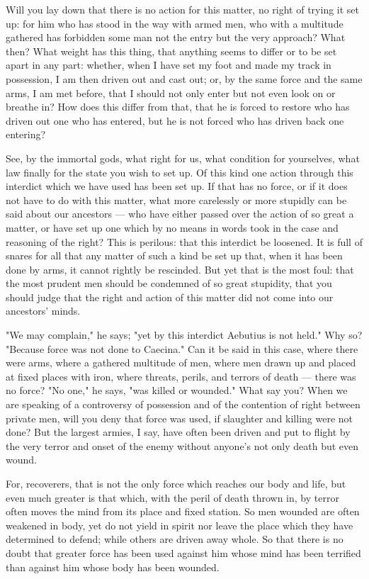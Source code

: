  Will you lay down that there is no action for this matter, no right of trying it set up: for him who has stood in the way with armed men, who with a multitude gathered has forbidden some man not the entry but the very approach? What then? What weight has this thing, that anything seems to differ or to be set apart in any part: whether, when I have set my foot and made my track in possession, I am then driven out and cast out; or, by the same force and the same arms, I am met before, that I should not only enter but not even look on or breathe in? How does this differ from that, that he is forced to restore who has driven out one who has entered, but he is not forced who has driven back one entering?

 See, by the immortal gods, what right for us, what condition for yourselves, what law finally for the state you wish to set up. Of this kind one action through this interdict which we have used has been set up. If that has no force, or if it does not have to do with this matter, what more carelessly or more stupidly can be said about our ancestors --- who have either passed over the action of so great a matter, or have set up one which by no means in words took in the case and reasoning of the right? This is perilous: that this interdict be loosened. It is full of snares for all that any matter of such a kind be set up that, when it has been done by arms, it cannot rightly be rescinded. But yet that is the most foul: that the most prudent men should be condemned of so great stupidity, that you should judge that the right and action of this matter did not come into our ancestors' minds.

 "We may complain," he says; "yet by this interdict Aebutius is not held." Why so? "Because force was not done to Caecina." Can it be said in this case, where there were arms, where a gathered multitude of men, where men drawn up and placed at fixed places with iron, where threats, perils, and terrors of death --- there was no force? "No one," he says, "was killed or wounded." What say you? When we are speaking of a controversy of possession and of the contention of right between private men, will you deny that force was used, if slaughter and killing were not done? But the largest armies, I say, have often been driven and put to flight by the very terror and onset of the enemy without anyone's not only death but even wound.

 For, recoverers, that is not the only force which reaches our body and life, but even much greater is that which, with the peril of death thrown in, by terror often moves the mind from its place and fixed station. So men wounded are often weakened in body, yet do not yield in spirit nor leave the place which they have determined to defend; while others are driven away whole. So that there is no doubt that greater force has been used against him whose mind has been terrified than against him whose body has been wounded.

